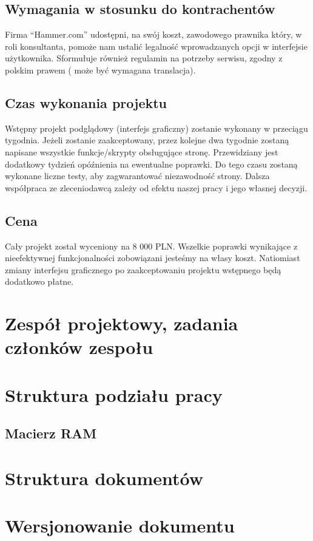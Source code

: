 \documentclass[10pt,a4paper]{article}
\begin{document}
  \subsection{Wymagania w stosunku do kontrachentów}
    Firma ``Hammer.com'' udostępni, na swój koszt, zawodowego prawnika który, w roli konsultanta, pomoże nam ustalić legalność wprowadzanych opcji w interfejsie użytkownika. Sformułuje również regulamin na potrzeby serwisu, zgodny z polskim prawem ( może być wymagana translacja).  
  \subsection{Czas wykonania projektu}
    Wstępny projekt podglądowy (interfejs graficzny) zostanie wykonany w przeciągu tygodnia. Jeżeli zostanie zaakceptowany, przez kolejne dwa tygodnie zostaną napisane wszystkie funkcje/skrypty obsługujące stronę. Przewidziany jest dodatkowy tydzień opóźnienia na ewentualne poprawki. Do tego czasu zostaną wykonane liczne testy, aby zagwarantować niezawodność strony. Dalsza współpraca ze zleceniodawcą zależy od efektu naszej pracy i jego własnej decyzji.
  \subsection{Cena}
    Cały projekt został wyceniony na 8 000 PLN. Wszelkie poprawki wynikające z nieefektywnej funkcjonalności zobowiązani jesteśmy na własy koszt. Natiomiast zmiany interfejsu graficznego po zaakceptowaniu projektu wstępnego będą dodatkowo płatne.
    
    
\section{Zespół projektowy, zadania członków zespołu}

\section{Struktura podziału pracy}
\subsection{Macierz RAM}

\section{Struktura dokumentów}

\section{Wersjonowanie dokumentu}
\end{document}
